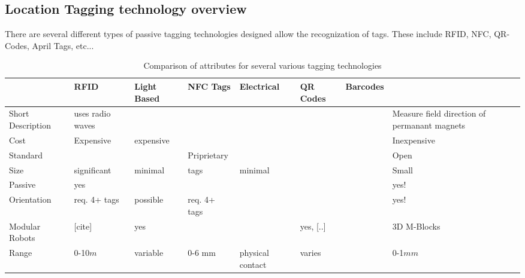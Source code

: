 	

\subsection{Location Tagging technology overview}
\label{sec:RWtaggingTech}

There are several different types of passive tagging technologies designed allow the recognization of tags. These include RFID, NFC, QR-Codes, April Tags, etc... 


\begin{table*}[t]
	\centering
	\caption{Comparison of attributes for several various tagging technologies}
	\newcommand{\wdd}{1.8cm}
	\begin{tabular}{ p{\wdd} |p{\wdd}  p{\wdd} p{\wdd} p{\wdd} p{\wdd} p{\wdd} p{\wdd}  }
		\hline
		& RFID 				%
		& Light Based		%
		& NFC Tags 			%
		& Electrical 		%
		& QR Codes 			%
		& Barcodes			%
		& \tagNamePlural \\ %
		\hline
		Short Description		& uses radio waves	& 			& 			& 					& 			& 	  	& Measure field direction of permanant magnets \\
		
		Cost			& Expensive	& expensive	& 			& 					& 			& 	  	& Inexpensive \\
		Standard		& 			&  			& Priprietary	& 					& 			& 	  						& Open \\
		Size 			& significant & minimal & tags  	& minimal	  				&       	&     	& Small		  \\
		Passive 		& yes		& 			&  			&	 				&			& 		& yes!		  \\
		Orientation 	& req. 4+ tags 		& possible 	& req. 4+ tags 	&	 				&	  		& 		& yes!		\\
		Modular Robots 	& [cite]	& yes		&	  		&					& yes, [..]	& 		& 3D M-Blocks\\
		Range			& 0-10$m$	& variable	& 0-6 mm	& physical contact	& varies	&		& 0-1$mm$	\\
	\end{tabular}	
	\label{tab:tagTech}    
\end{table*}
